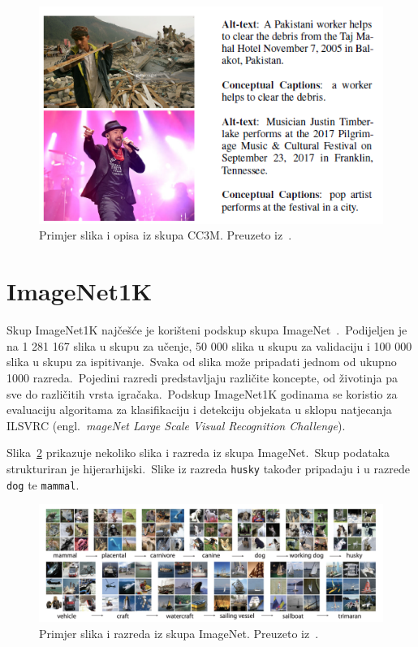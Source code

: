 \documentclass[times, utf8, seminar, numeric]{fer}
\begin{document}
\begin{figure}[h]
    \centering
    \includegraphics[scale=0.7]{./Slike/CC3M.png}
    \caption{Primjer slika i opisa iz skupa CC3M. Preuzeto iz~\cite{sharma2018conceptual}.}
    \label{fig:CC3M}
\end{figure}

\section{ImageNet1K}

Skup ImageNet1K najčešće je korišteni podskup skupa ImageNet~\cite{deng2009imagenet}.\ 
Podijeljen je na 1 281 167 slika u skupu za učenje, 50 000 slika u skupu za validaciju i 100 000 slika u skupu za ispitivanje.\ 
Svaka od slika može pripadati jednom od ukupno 1000 razreda.\ Pojedini razredi predstavljaju različite koncepte, od životinja pa sve do različitih vrsta igračaka.\ 
Podskup ImageNet1K godinama se koristio za evaluaciju algoritama za klasifikaciju i detekciju objekata u sklopu natjecanja ILSVRC (engl.\ \textit{mageNet Large Scale Visual Recognition Challenge}).\
  
Slika~\ref{fig:imagenet} prikazuje nekoliko slika i razreda iz skupa ImageNet.\ Skup podataka strukturiran je hijerarhijski.\ Slike iz razreda \texttt{husky} također pripadaju i u razrede \texttt{dog} te \texttt{mammal}.\

\begin{figure}[h]
    \centering
    \includegraphics[scale=0.33]{./Slike/imagenet.png}
    \caption{Primjer slika i razreda iz skupa ImageNet. Preuzeto iz~\cite{deng2009imagenet}.}
    \label{fig:imagenet}
\end{figure}
\end{document}
